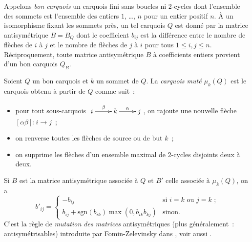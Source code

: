 \documentclass[brochure,12pt]{bourbaki}
\numberwithin{equation}{subsection}
\numberwithin{theorem}{section}
\newcommand{\sgn}{\mbox{sgn}}
\begin{document}
Appelons {\em bon carquois} un carquois fini sans boucles
ni $2$-cycles dont l'ensemble des sommets est l'ensemble des entiers
$1$, \ldots, $n$ pour un entier positif $n$. \`A un isomorphisme
fixant les sommets pr\`es, un tel carquois $Q$ est donn\'e par la
matrice antisym\'etrique $B=B_Q$ dont le coefficient $b_{ij}$ est
la diff\'erence entre le nombre de fl\`eches de $i$ \`a $j$ et
le nombre de fl\`eches de $j$ \`a $i$ pour tous $1\leq i,j\leq n$.
R\'eciproquement, toute matrice antisym\'etrique $B$ \`a coefficients
entiers provient d'un bon carquois $Q_B$.

Soient $Q$ un bon carquois et $k$ un sommet de $Q$. La {\em carquois mut\'e $\mu_k(Q)$}
est le carquois obtenu \`a partir de $Q$ comme suit~:
\begin{itemize}
\item[(1)] pour tout sous-carquois $\xymatrix{i \ar[r]^\beta & k \ar[r]^\alpha & j}$,
on rajoute une nouvelle fl\`eche $[\alpha\beta]: i \to j$~;
\item[(2)] on renverse toutes les fl\`eches de source ou de but $k$~;
\item[(3)] on supprime les fl\`eches d'un ensemble maximal de $2$-cycles disjoints
deux \`a deux.
\end{itemize}
Si $B$ est la matrice antisym\'etrique associ\'ee \`a $Q$ et $B'$ celle associ\'ee
\`a $\mu_k(Q)$, on a
\[
b'_{ij} = \left\{ \begin{array}{ll}
-b_{ij} & \mbox{si $i=k$ ou $j=k$~;} \\
b_{ij}+\sgn(b_{ik})\max(0, b_{ik} b_{kj}) & \mbox{sinon.}
\end{array} \right.
\]
C'est la r\`egle de {\em mutation des matrices} antisym\'etriques
(plus g\'en\'eralement~: antisym\'etrisables) introduite
par Fomin-Zelevinsky dans \cite{FominZelevinsky02},
voir aussi \cite{FominZelevinsky07}.
\end{document}
